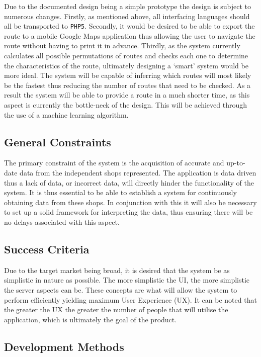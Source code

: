 \documentclass[10pt, a4paper, onecolumn]{scrartcl}
\begin{document}
			Due to the documented design being a simple prototype the design is subject to numerous changes. Firstly, as mentioned above, all interfacing languages should all be transported to \texttt{PHP5}. Secondly, it would be desired to be able to export the route to a mobile Google Maps application thus allowing the user to navigate the route without having to print it in advance. Thirdly, as the system currently calculates all possible permutations of routes and checks each one to determine the characteristics of the route, ultimately designing a `smart' system would be more ideal. The system will be capable of inferring which routes will most likely be the fastest thus reducing the number of routes that need to be checked. As a result the system will be able to provide a route in a much shorter time, as this aspect is currently the bottle-neck of the design. This will be achieved through the use of a machine learning algorithm. 
			
		\subsection{General Constraints}
		
			The primary constraint of the system is the acquisition of accurate and up-to-date data from the independent shops represented. The application is data driven thus a lack of data, or incorrect data, will directly hinder the functionality of the system. It is thus essential to be able to establish a system for continuously obtaining data from these shops. In conjunction with this it will also be necessary to set up a solid framework for interpreting the data, thus ensuring there will be no delays associated with this aspect.
		
		\subsection{Success Criteria}
		
			Due to the target market being broad, it is desired that the system be as simplistic in nature as possible. The more simplistic the UI, the more simplistic the server aspects can be. These concepts are what will allow the system to perform efficiently yielding maximum User Experience (UX). It can be noted that the greater the UX the greater the number of people that will utilise the application, which is ultimately the goal of the product. \\
			
		\subsection{Development Methods}
		
\end{document}
